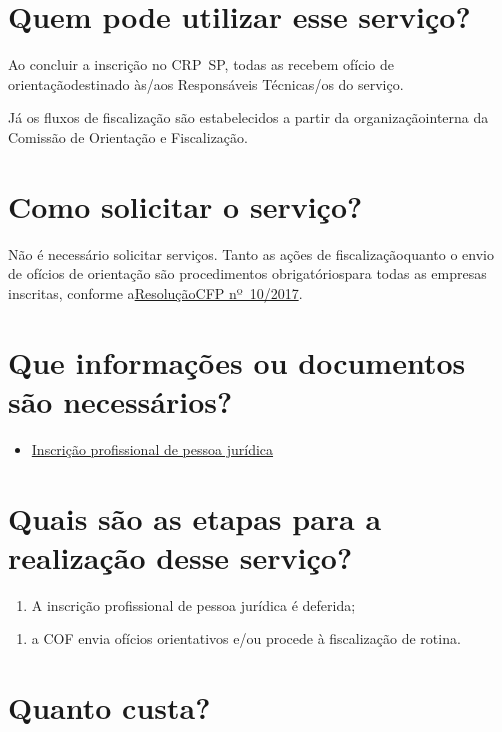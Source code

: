 \section{Quem pode utilizar esse serviço?}

Ao concluir a inscrição no CRP~SP, todas as recebem ofício de orientaçãodestinado às/aos Responsáveis Técnicas/os do serviço.

Já os fluxos de fiscalização são estabelecidos a partir da organizaçãointerna da Comissão de Orientação e Fiscalização.

\section{Como solicitar o serviço?}

Não é necessário solicitar serviços. Tanto as ações de fiscalizaçãoquanto o envio de ofícios de orientação são procedimentos obrigatóriospara todas as empresas inscritas, conforme a\href{https://transparencia.cfp.org.br/wp-content/uploads/sites/10/2017/07/Resolu\%C3\%A7\%C3\%A3o-CFP-010-2017-Politica-de-Orienta\%C3\%A7\%C3\%A3o-e-Fiscaliza\%C3\%A7\%C3\%A3o-dos-Conselhos.pdf}{ResoluçãoCFP nº~10/2017}.

\section{Que informações ou documentos são necessários?}

\begin{itemize}
  \item  \hyperref[]{Inscrição  profissional de pessoa jurídica}
\end{itemize}

\section{Quais são as etapas para a realização desse serviço?}

\begin{enumerate}
  \item  A inscrição profissional de pessoa jurídica é deferida;
\end{enumerate}

\begin{enumerate}
  \item  a COF envia ofícios orientativos e/ou procede à fiscalização de  rotina.
\end{enumerate}

\section{Quanto custa?}

